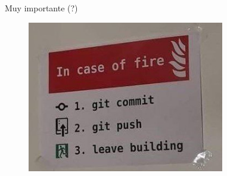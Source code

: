\begin{frame}[t]{Muy importante (?)}
    \begin{figure}[ht]
        \begin{center}
            \includegraphics[height=2.6in]{images/in-case-of-fire.jpg}
        \end{center}
    \end{figure}
\end{frame}
